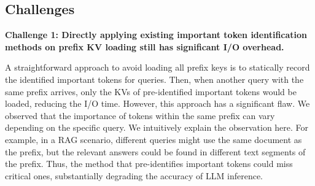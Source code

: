 
\subsection{Challenges}

\noindent \textbf{Challenge 1: Directly applying existing important token identification methods on prefix KV loading still has significant I/O overhead.}

A straightforward approach to avoid loading all prefix keys is to statically record the identified important tokens for queries. Then, when another query with the same prefix arrives, only the KVs of pre-identified important tokens would be loaded, reducing the I/O time.
However, this approach has a significant flaw. We observed that the importance
of tokens within the same prefix can vary depending on the specific query. We
intuitively explain the observation here. For example, in a RAG scenario,
different queries might use the same document as the prefix, but the relevant
answers could be found in different text segments of the prefix. 
Thus, the method that pre-identifies important tokens could miss critical ones, substantially degrading the accuracy of LLM inference.


